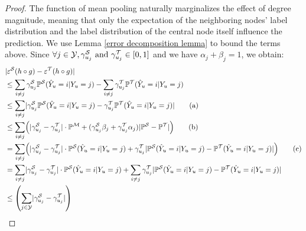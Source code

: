 \begin{proof}

The function of mean pooling naturally marginalizes the effect of degree magnitude, meaning that only the expectation of the neighboring nodes' label distribution and the label distribution of the central node itself influence the prediction.
We use Lemma \ref{error decomposition lemma} to bound the terms above.
Since $\forall j \in \mathcal{Y},
\gamma^{\mathcal{S}}_{u_j} \text{ and } \gamma^{\mathcal{T}}_{u_j} \in [0,1]$ and we have $\alpha_j + \beta_j = 1$, we obtain:
\begin{align*}
    &|\errors(h \circ g) - \errort(h \circ g)| \\
    &\leq 
    \sum_{i\neq j}\gammas{u_j}\probs(\predy_u=i| \rvY_u=j) - \sum_{i\neq j}\gammat{u_j}\probt(\predy_u=i| \rvY_u=j)
    \\
    &\leq \sum_{i\neq j}
    \abs{\gammas{u_j}\probs(\predy_u=i| \rvY_u=j) - \gammat{u_j}\probt(\predy_u=i| \rvY_u=j)} 
    \tag{a}
    \\
    &\leq \sum_{i\neq j}
    \rpar*{\abs{\gammas{u_j} - \gammat{u_j}} \cdot 
    \probm
    +(\gammas{u_j}\beta_j + \gammat{u_j}\alpha_j )
    \abs{ \probs - \probt}  
    }
    \tag{b}
    \\
    &= \sum_{i\neq j}
    \rpar*{\abs{\gammas{u_j} - \gammat{u_j}} \cdot\probs(\predy_u=i| \rvY_u=j) + \gammat{u_j}
    \abs{\probs(\predy_u=i| \rvY_u=j) - \probt(\predy_u=i| \rvY_u=j)}
    }
    \tag{c}
    \\
    &= \sum_{i\neq j}\abs{\gammas{u_j} - \gammat{u_j}} \cdot\probs(\predy_u=i| \rvY_u=j) + \sum_{i\neq j}\gammat{u_j}
    \abs{\probs(\predy_u=i| \rvY_u=j) - \probt(\predy_u=i| \rvY_u=j)}
    \\
    &\leq 
    \rpar*{\sum_{j\in\gY}\abs{\gammas{u_j} - \gammat{u_j}} }

\end{align*}
\end{proof}
